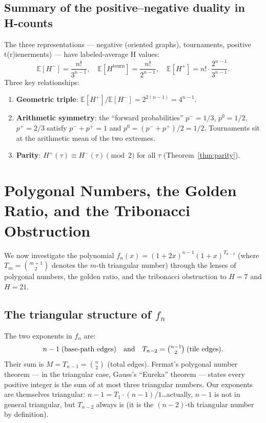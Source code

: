 \documentclass[12pt,reqno]{amsart}
\theoremstyle{definition}
\theoremstyle{plain}
\begin{document}
\subsection{Summary of the positive–negative duality in H-counts}

The three representations — negative (oriented graphs), tournaments, positive
t(r)ienerments) — have labeled-average H values:
\[
  \mathbb{E}[H^-]=\frac{n!}{3^{n-1}},\quad
  \mathbb{E}[H^{\mathrm{tourn}}]=\frac{n!}{2^{n-1}},\quad
  \mathbb{E}[H^+]=n!\cdot\frac{2^{n-1}}{3^{n-1}}.
\]
Three key relationships:
\begin{enumerate}
\item \textbf{Geometric triple}: $\mathbb{E}[H^+]/\mathbb{E}[H^-]=2^{2(n-1)}
  =4^{n-1}$.
\item \textbf{Arithmetic symmetry}: the ``forward probabilities'' $p^-=1/3$,
  $p^0=1/2$, $p^+=2/3$ satisfy $p^-+p^+=1$ and $p^0=(p^-+p^+)/2=1/2$.
  Tournaments sit at the arithmetic mean of the two extremes.
\item \textbf{Parity}: $H^+(\tau)\equiv H^-(\tau)\pmod 2$ for all $\tau$
  (Theorem~\ref{thm:parity}).
\end{enumerate}

\section{Polygonal Numbers, the Golden Ratio, and the Tribonacci Obstruction}
\label{sec:polygonal}

We now investigate the polynomial $f_n(x)=(1+2x)^{n-1}(1+x)^{T_{n-2}}$
(where $T_m=\binom{m+1}{2}$ denotes the $m$-th triangular number) through the
lenses of polygonal numbers, the golden ratio, and the tribonacci obstruction to
$H=7$ and $H=21$.

\subsection{The triangular structure of \texorpdfstring{$f_n$}{f\_n}}
\label{ssec:triangular}

The two exponents in $f_n$ are:
\[
  n-1 \;(\text{base-path edges})\quad\text{and}\quad
  T_{n-2}=\tbinom{n-1}{2} \;(\text{tile edges}).
\]
Their sum is $M=T_{n-1}=\binom{n}{2}$ (total edges).
Fermat's polygonal number theorem — in the triangular case, Gauss's
``Eureka'' theorem — states every positive integer is the sum of at most three
triangular numbers.  Our exponents are themselves triangular:
$n-1=T_1\cdot(n-1)/1$\ldots actually, $n-1$ is not in general triangular, but
$T_{n-2}$ always is (it is the $(n-2)$-th triangular number by definition).
\end{document}
